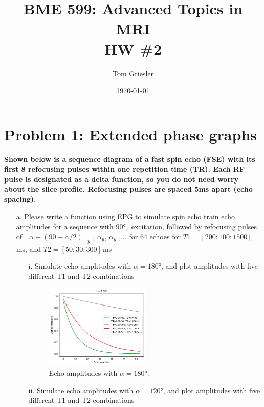 \documentclass{article}
\title{BME 599: Advanced Topics in MRI\\HW \#2}
\author{Tom Griesler}
\date{\today}
\begin{document}
\maketitle

\section{Problem 1: Extended phase graphs}
\textbf{Shown below is a sequence diagram of a fast spin echo (FSE) with its first 8 refocusing pulses within one repetition time (TR). Each RF pulse is designated as a delta function, so you do not need worry about the slice profile. Refocusing pulses are spaced 5ms apart (echo spacing).}

\begin{itemize}

    \item[a.] Please write a function using EPG to simulate spin echo train echo amplitudes for a sequence with $90$°$_x$ excitation, followed by refocusing pulses of $[\alpha+(90- \alpha/2)]_y$ , $\alpha_y$, $\alpha_y$ ,... for 64 echoes for $T1 = [200:100:1500]\,$ms, and $T2 = [50:30:300]\,$ms
    
        \begin{itemize}

            \item[i.] Simulate echo amplitudes with $\alpha = 180$°, and plot amplitudes with five different T1 and T2 combinations
            
                \begin{figure}[h!]
                    \centering
                    \includegraphics[width=0.5\textwidth]{figures/1_a_i.png}
                    \caption{Echo amplitudes with $\alpha=180$°.}
                    \label{}
                \end{figure}

            \item[ii.] Simulate echo amplitudes with $\alpha = 120$°, and plot amplitudes with five different T1 and T2 combinations
            

\end{itemize}
\end{itemize}
\end{document}
